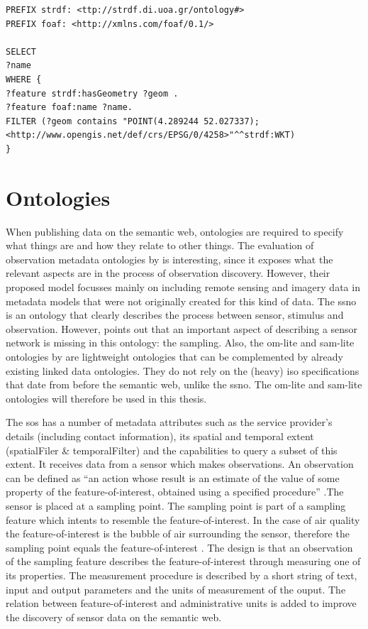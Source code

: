 \begin{lstlisting}[caption={A stSPARQL query to find the names of features that contain a point geometry}, label={lst:stSPARQL}]
PREFIX strdf: <ttp://strdf.di.uoa.gr/ontology#>
PREFIX foaf: <http://xmlns.com/foaf/0.1/> 

SELECT 
?name
WHERE {
?feature strdf:hasGeometry ?geom .
?feature foaf:name ?name.
FILTER (?geom contains "POINT(4.289244 52.027337);<http://www.opengis.net/def/crs/EPSG/0/4258>"^^strdf:WKT)
}
\end{lstlisting}

\section{Ontologies}
When publishing data on the semantic web, ontologies are required to specify what things are and how they relate to other things. The evaluation of observation metadata ontologies by \cite{SW:Hu} is interesting, since it exposes what the relevant aspects are in the process of observation discovery. However, their proposed model focusses mainly on including remote sensing and imagery data in metadata models that were not originally created for this kind of data. The \ac{ssno} is an ontology that clearly describes the process between sensor, stimulus and observation. However, \cite{SSW:Cox4} points out that an important aspect of describing a sensor network is missing in this ontology: the sampling. Also, the om-lite and sam-lite ontologies by \cite{SSW:Cox4} are lightweight ontologies that can be complemented by already existing linked data ontologies. They do not rely on the (heavy) \ac{iso} specifications that date from before the semantic web, unlike the \ac{ssno}. The om-lite and sam-lite ontologies will therefore be used in this thesis. 

The \ac{sos} has a number of metadata attributes such as the service provider's details (including contact information), its spatial and temporal extent (spatialFiler \& temporalFilter) and the capabilities to query a subset of this extent. It receives data from a sensor which makes observations. An observation can be defined as \enquote{an action whose result is an estimate of the value of some property of the feature-of-interest, obtained using a specified procedure} \citep{SSW:Cox3}.The sensor is placed at a sampling point. The sampling point is part of a sampling feature which intents to resemble the feature-of-interest. In the case of air quality the feature-of-interest is the bubble of air surrounding the sensor, therefore the sampling point equals the feature-of-interest \citep{SDI:INSPIRE2}. The design is that an observation of the sampling feature describes the  feature-of-interest through measuring one of its properties. The measurement procedure is described by a short string of text, input and output parameters and the units of measurement of the ouput. The relation between feature-of-interest and administrative units is added to improve the discovery of sensor data on the semantic web. 

